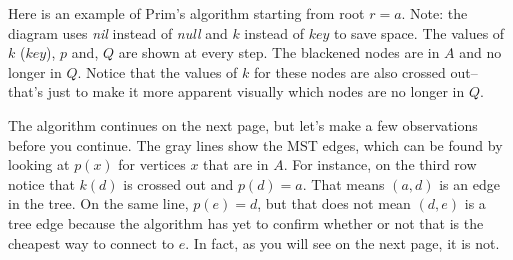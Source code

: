 \begin{exa}
Here is an example of Prim's algorithm starting from root $r=a$.
Note: the diagram uses {\em nil} instead of {\em null} 
and $k$ instead of $key$ to save space.
The values of $k$ ($key$), $p$ and, $Q$ are shown at every step.
The blackened nodes are in $A$ and no longer in $Q$. Notice that
the values of $k$ for these nodes are also crossed out--that's just
to make it more apparent visually which nodes are no longer in $Q$.
\\


The algorithm continues on the next page, but let's make 
a few observations before you continue.
The gray lines show the MST edges, which can be found by looking at $p(x)$ for vertices $x$ that are in $A$. For instance, on the third row
notice that $k(d)$ is crossed out and $p(d)=a$. That means
$(a,d)$ is an edge in the tree.
On the same line, $p(e)=d$, but that does not
mean $(d,e)$ is a tree edge because the algorithm has 
yet to confirm whether or not that is the cheapest way to connect
to $e$. In fact, as you will see on the next page, it is not.

\end{exa}


